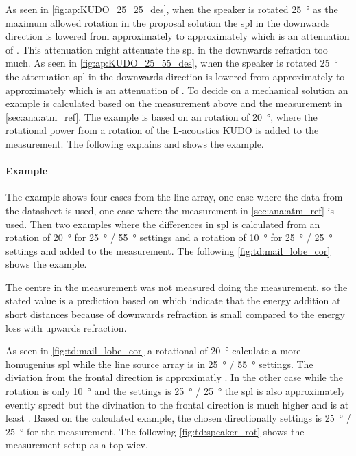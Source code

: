 As seen in \autoref{fig:ap:KUDO_25_25_des}, when the speaker is rotated \SI{25}{\degree} as the maximum allowed rotation in the proposal solution the \gls{spl} in the downwards direction is lowered from approximately  to approximately  which is an attenuation of . This  attenuation might attenuate the \gls{spl} in the downwards refration too much. As seen in \autoref{fig:ap:KUDO_25_55_des}, when the speaker is rotated \SI{25}{\degree} the attenuation \gls{spl} in the downwards direction is lowered from approximately  to approximately  which is an attenuation of . To decide on a mechanical solution an example is calculated based on the measurement above and the measurement in \autoref{sec:ana:atm_ref}. The example is based on an rotation of \SI{20}{\degree}, where the rotational power from a rotation of the L-acoustics KUDO is added to the measurement. The following explains and shows the example.


\paragraph{Example} The example shows four cases from the line array, one case where the data from the datasheet is used, one case where the measurement in \autoref{sec:ana:atm_ref} is used. Then two examples where the differences in \gls{spl} is calculated from an rotation of \SI{20}{\degree} for \SI{25}{\degree} / \SI{55}{\degree} settings and a rotation of  \SI{10}{\degree} for \SI{25}{\degree} / \SI{25}{\degree} settings and added to the measurement. The following \autoref{fig:td:mail_lobe_cor} shows the example.



The centre in the measurement was not measured doing the measurement, so the stated value is a prediction based on \citep{review_of_sound} which indicate that the energy addition at short distances because of downwards refraction is small compared to the energy loss with upwards refraction. 

As seen in \autoref{fig:td:mail_lobe_cor} a rotational of \SI{20}{\degree} calculate a more homugenius \gls{spl} while the line source array is in \SI{25}{\degree} / \SI{55}{\degree} settings. The diviation from the frontal direction is approximatly . In the other case while the rotation is only \SI{10}{\degree} and the settings is \SI{25}{\degree} / \SI{25}{\degree} the \gls{spl} is also approximately evently spredt but the divination to the frontal direction is much higher and is at least . Based on the calculated example, the chosen directionally settings is \SI{25}{\degree} / \SI{25}{\degree} for the measurement. The following \autoref{fig:td:speaker_rot} shows the measurement setup as a top wiev. 

